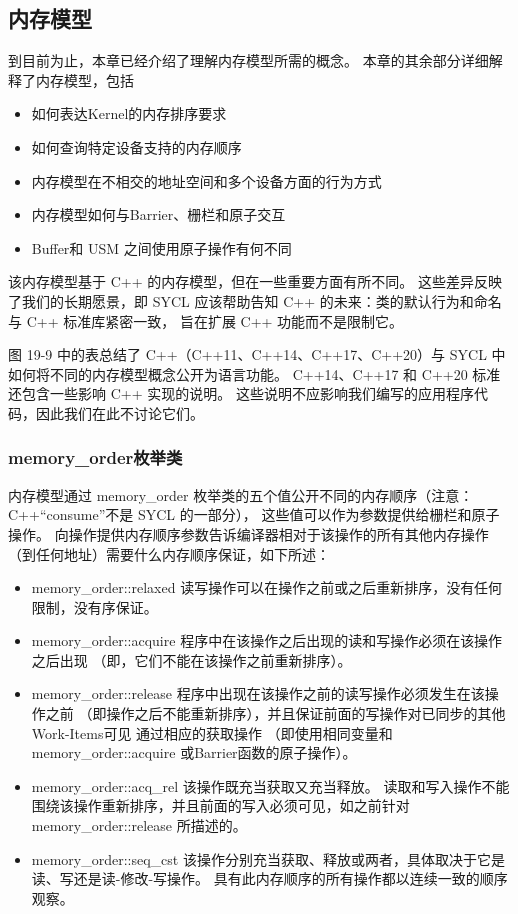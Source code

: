 \subsection{内存模型}
到目前为止，本章已经介绍了理解内存模型所需的概念。 本章的其余部分详细解释了内存模型，包括

\begin{itemize}
	\item 如何表达Kernel的内存排序要求

	\item 如何查询特定设备支持的内存顺序

	\item 内存模型在不相交的地址空间和多个设备方面的行为方式

	\item 内存模型如何与Barrier、栅栏和原子交互

	\item Buffer和 USM 之间使用原子操作有何不同
\end{itemize}

该内存模型基于 C++ 的内存模型，但在一些重要方面有所不同。 
这些差异反映了我们的长期愿景，即 SYCL 应该帮助告知 C++ 的未来：类的默认行为和命名与 C++ 标准库紧密一致，
旨在扩展 C++ 功能而不是限制它。

图 19-9 中的表总结了 C++（C++11、C++14、C++17、C++20）与 SYCL 中如何将不同的内存模型概念公开为语言功能。 
C++14、C++17 和 C++20 标准还包含一些影响 C++ 实现的说明。 
这些说明不应影响我们编写的应用程序代码，因此我们在此不讨论它们。

\subsubsection{memory\_order枚举类}
内存模型通过 memory\_order 枚举类的五个值公开不同的内存顺序（注意：C++“consume”不是 SYCL 的一部分），
这些值可以作为参数提供给栅栏和原子操作。 
向操作提供内存顺序参数告诉编译器相对于该操作的所有其他内存操作（到任何地址）需要什么内存顺序保证，如下所述：

\begin{itemize}
	\item memory\_order::relaxed 读写操作可以在操作之前或之后重新排序，没有任何限制，没有序保证。

	\item memory\_order::acquire 程序中在该操作之后出现的读和写操作必须在该操作之后出现
	（即，它们不能在该操作之前重新排序）。

	\item memory\_order::release 程序中出现在该操作之前的读写操作必须发生在该操作之前
	（即操作之后不能重新排序），并且保证前面的写操作对已同步的其他Work-Items可见 通过相应的获取操作
	（即使用相同变量和 memory\_order::acquire 或Barrier函数的原子操作）。

	\item memory\_order::acq\_rel 该操作既充当获取又充当释放。 
	读取和写入操作不能围绕该操作重新排序，并且前面的写入必须可见，如之前针对 memory\_order::release 所描述的。

	\item memory\_order::seq\_cst 该操作分别充当获取、释放或两者，具体取决于它是读、写还是读-修改-写操作。 
	具有此内存顺序的所有操作都以连续一致的顺序观察。
\end{itemize}

